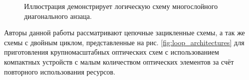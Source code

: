 \documentclass[14pt]{extarticle}
\begin{document}
\begin{figure}[H]
\caption{Иллюстрация демонстрирует логическую схему многослойного диагонального анзаца.}\label{fig:layered_ansatz}
\end{figure}

\qquad Авторы данной работы рассматривают цепочные зацикленные схемы, а так же схемы с двойным циклом, представленные на рис. \ref{fig:loop_architectures} для приготовления крупномасштабных оптических схем с использованием компактных устройств с малым количеством оптических элементов за счёт повторного использования ресурсов. 
\end{document}
